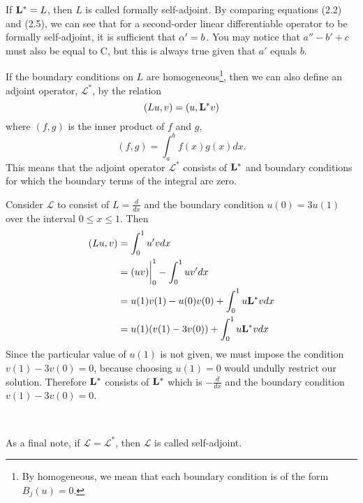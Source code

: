 If \(\mathrm{\bf{L^*}}  = L\), then \(L\) is called formally self-adjoint. By comparing equations (2.2) and (2.5), we can see that for a second-order linear differentiable operator to be formally self-adjoint, it is sufficient that \(\alpha'=b\). You may notice that \(a''-b'+c\) must also be equal to C, but this is always true given that \(a'\) equals \(b\).

\begin{definition}
	If the boundary conditions on \(L\) are homogeneous\footnote{By homogeneous, we mean that each boundary condition is of the form \(B_j(u)=0\).}, then we can also define an adjoint operator, \(\mathcal{L}^*\), by the relation
	\begin{equation}
		(Lu,v) = (u,\mathrm{\bf{L^*}} v)
	\end{equation}
	where \((f,g)\) is the inner product of \(f\) and \(g\),
	\begin{equation}
		(f,g) = \int_a^bf(x)g(x)dx.
	\end{equation}
	This means that the adjoint operator \(\mathcal{L}^*\) consists of \(\mathrm{\bf{L^*}} \) and boundary conditions for which the boundary terms of the integral are zero. 
\end{definition}

\begin{example}
	Consider \(\mathcal{L}\) to consist of \(L=\frac{d}{dx}\) and the boundary condition \(u(0)=3u(1)\) over the interval \(0\leq x \leq 1\). Then
	\begin{equation}
		\begin{split}
			(Lu,v) &= \int_0^1u'vdx\\
			       &= (uv)\biggr\rvert_0^1 - \int_0^1 uv'dx\\
			       &= u(1)v(1)-u(0)v(0)+\int_0^1u\mathrm{\bf{L^*}} vdx\\
			       &= u(1)(v(1)-3v(0)) + \int_0^1u\mathrm{\bf{L^*}} vdx
		\end{split}
	\end{equation}
	Since the particular value of \(u(1)\) is not given, we must impose the condition \(v(1)-3v(0)=0\), because choosing \(u(1)=0\) would undully restrict our solution. Therefore \(\mathcal{\mathrm{\bf{L^*}}  }\) consists of \(\mathrm{\bf{L^*}}  \) which is \(-\frac{d}{dx}\) and the boundary condition \(v(1) - 3v(0)=0\). 
\end{example}

\

As a final note, if \(\mathcal{L}=\mathcal{L}^*\), then \(\mathcal{L}\) is called self-adjoint.
